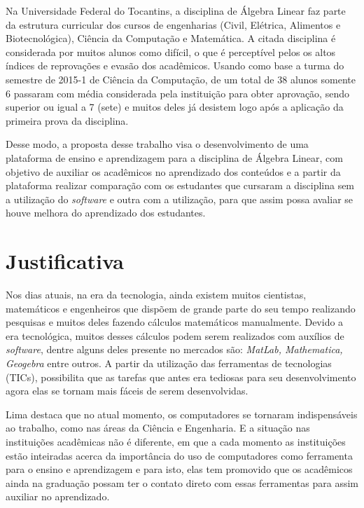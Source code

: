 Na Universidade Federal do Tocantins, a disciplina de Álgebra Linear faz parte da estrutura curricular dos cursos de engenharias (Civil, Elétrica, Alimentos e Biotecnológica), Ciência da Computação e Matemática. A citada disciplina é considerada por muitos alunos como difícil, o que é perceptível pelos os altos índices de reprovações e evasão dos acadêmicos. Usando como base a turma do semestre de 2015-1 de Ciência da Computação, de um total de 38 alunos somente 6 passaram com média considerada pela instituição para obter aprovação, sendo superior ou igual a 7 (sete) e muitos deles já desistem logo após a aplicação da primeira prova da disciplina.  

Desse modo, a proposta desse trabalho visa o desenvolvimento de uma plataforma de ensino e aprendizagem para a disciplina de Álgebra Linear, com objetivo de auxiliar os acadêmicos no aprendizado dos conteúdos e a partir da plataforma realizar comparação com os estudantes que cursaram a disciplina sem a utilização do \textit{software} e outra com a utilização, para que assim possa avaliar se houve melhora do aprendizado dos estudantes.

\section{Justificativa}

\noindent Nos dias atuais, na era da tecnologia, ainda existem muitos cientistas, matemáticos e engenheiros que dispõem de grande parte do seu tempo realizando pesquisas e muitos deles fazendo cálculos matemáticos manualmente. Devido a era tecnológica, muitos desses cálculos podem serem realizados com auxílios de \textit{software}, dentre alguns deles presente no mercados são: \textit{MatLab, Mathematica, Geogebra} entre outros. A partir da utilização das ferramentas de tecnologias (TICs), possibilita que as tarefas que antes era tediosas para seu desenvolvimento agora elas se tornam mais fáceis de serem desenvolvidas.

Lima \cite{2000:lima} destaca que no atual momento, os computadores se tornaram indispensáveis ao trabalho, como nas áreas da Ciência e Engenharia. E a situação nas instituições acadêmicas não é diferente, em que a cada momento as instituições estão inteiradas acerca da importância do uso de computadores como ferramenta para o ensino e aprendizagem e para isto, elas tem promovido que os acadêmicos ainda na graduação possam ter o contato direto com essas ferramentas para assim auxiliar no aprendizado.

